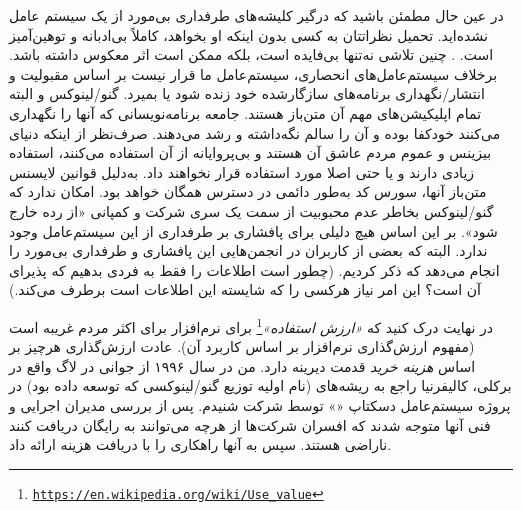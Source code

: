 در عین حال مطمئن باشید که درگیر کلیشه‌های طرفداری بی‌مورد از یک سیستم عامل نشده‌اید.
تحمیل نظراتتان به کسی بدون اینکه او بخواهد، کاملاً بی‌ادبانه و توهین‌آمیز است.
. چنین تلاشی نه‌تنها بی‌فایده است، بلکه ممکن است اثر معکوس داشته باشد.
برخلاف سیستم‌عامل‌های انحصاری، سیستم‌عامل ما قرار نیست بر اساس مقبولیت و انتشار/نگهداری
برنامه‌های سازگارشده خود زنده شود یا بمیرد.
گنو/لینوکس و البته تمام اپلیکیشن‌های مهم آن متن‌باز هستند. جامعه برنامه‌نویسانی که آنها
را نگهداری می‌کنند خودکفا بوده و آن را سالم نگه‌داشته و رشد می‌دهند.
صرف‌نظر از اینکه دنیای بیزینس و عموم مردم عاشق آن هستند و بی‌پروایانه از آن استفاده می‌کنند،
استفاده زیادی دارند و یا حتی اصلا مورد استفاده قرار نخواهند داد.
به‌دلیل قوانین لایسنس متن‌باز آنها، سورس کد به‌طور دائمی در دسترس همگان خواهد بود.
امکان ندارد که گنو/لینوکس بخاطر عدم محبوبیت از سمت یک سری شرکت و کمپانی
«از رده خارج شود». بر این اساس هیچ دلیلی برای پافشاری بر طرفداری از این سیستم‌عامل
وجود ندارد. البته که بعضی از کاربران در انجمن‌هایی این پافشاری و طرفداری بی‌مورد را
انجام می‌دهد که ذکر کردیم. (چطور است اطلاعات را فقط به فردی بدهیم که پذیرای آن است؟
این امر نیاز هرکسی را که شایسته این اطلاعات است برطرف می‌کند.)

در نهایت درک کنید که
\emph{«ارزش استفاده»}\footnote{\texttt{\url{https://en.wikipedia.org/wiki/Use_value}}}
برای نرم‌افزار برای اکثر مردم غریبه است (مفهوم ارزش‌گذاری نرم‌افزار بر اساس کاربرد آن).
عادت ارزش‌گذاری هرچیز بر اساس
{\itshape هزینه خرید}
قدمت دیرینه دارد.
من در سال ۱۹۹۶ از جوانی در لاگ واقع در برکلی، کالیفرنیا راجع به ریشه‌های
(نام اولیه توزیع گنو/لینوکسی که توسعه داده بود) در پروژه
سیستم‌عامل دسکتاپ «» توسط شرکت  شنیدم.
پس از بررسی مدیران اجرایی و فنی آنها متوجه شدند که افسران شرکت‌ها
از هرچه می‌توانند به رایگان دریافت کنند ناراضی هستند. سپس 
به آنها راهکاری را با دریافت هزینه ارائه داد.

